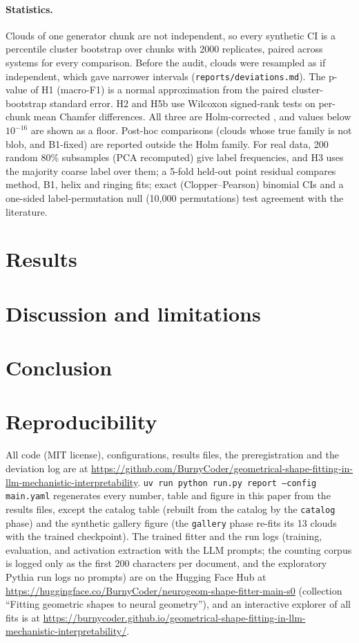\documentclass[10pt]{article}
\begin{document}
\paragraph{Statistics.} Clouds of one generator chunk are not independent, so every synthetic CI is a percentile cluster bootstrap over chunks \citep{field2007bootstrap} with 2000 replicates, paired across systems for every comparison. Before the audit, clouds were resampled as if independent, which gave narrower intervals (\texttt{reports/deviations.md}). The p-value of H1 (macro-F1) is a normal approximation from the paired cluster-bootstrap standard error. H2 and H5b use Wilcoxon signed-rank tests on per-chunk mean Chamfer differences. All three are Holm-corrected \citep{holm1979}, and values below $10^{-16}$ are shown as a floor. Post-hoc comparisons (clouds whose true family is not blob, and B1-fixed) are reported outside the Holm family. For real data, 200 random 80\% subsamples (PCA recomputed) give label frequencies, and H3 uses the majority coarse label over them; a 5-fold held-out point residual compares method, B1, helix and ringing fits; exact (Clopper--Pearson) binomial CIs and a one-sided label-permutation null (10{,}000 permutations) test agreement with the literature.

\section{Results}
\label{sec:results}


\section{Discussion and limitations}


\section{Conclusion}


\section*{Reproducibility}
All code (MIT license), configurations, results files, the preregistration and the deviation log are at \url{https://github.com/BurnyCoder/geometrical-shape-fitting-in-llm-mechanistic-interpretability}. \texttt{uv run python run.py report --config main.yaml} regenerates every number, table and figure in this paper from the results files, except the catalog table (rebuilt from the catalog by the \texttt{catalog} phase) and the synthetic gallery figure (the \texttt{gallery} phase re-fits its 13 clouds with the trained checkpoint). The trained fitter and the run logs (training, evaluation, and activation extraction with the LLM prompts; the counting corpus is logged only as the first 200 characters per document, and the exploratory Pythia run logs no prompts) are on the Hugging Face Hub at \url{https://huggingface.co/BurnyCoder/neurogeom-shape-fitter-main-s0} (collection ``Fitting geometric shapes to neural geometry''), and an interactive explorer of all fits is at \url{https://burnycoder.github.io/geometrical-shape-fitting-in-llm-mechanistic-interpretability/}.
\end{document}
